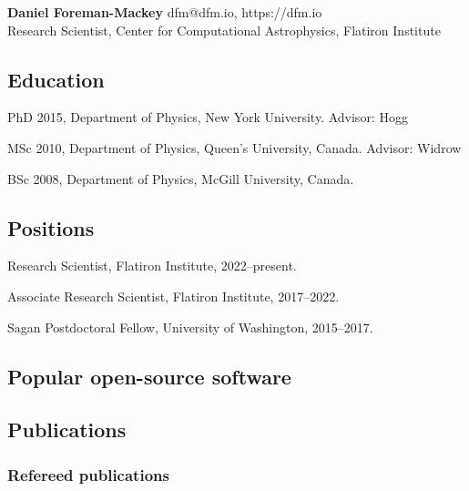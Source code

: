 \documentclass[12pt,letterpaper]{article}
\begin{document}
\thispagestyle{empty}\sloppy\sloppypar\raggedbottom

\textbf{\Large Daniel Foreman-Mackey} \hfill
\textsf{\small dfm@dfm.io, https://dfm.io} \\[0.5ex]
Research Scientist, Center for Computational Astrophysics, Flatiron Institute\\[0.5ex]

\subsection{Education}
\begin{list}{}{\cvlist}
  \item
        PhD 2015, Department of Physics, New York University. Advisor: Hogg
  \item
        MSc 2010, Department of Physics, Queen's University, Canada. Advisor: Widrow
  \item
        BSc 2008, Department of Physics, McGill University, Canada.
\end{list}

\subsection{Positions}
\begin{list}{}{\cvlist}
  \item
        Research Scientist, Flatiron Institute, 2022--present.
  \item
        Associate Research Scientist, Flatiron Institute, 2017--2022.
  \item
        Sagan Postdoctoral Fellow, University of Washington, 2015--2017.
\end{list}

\subsection{Popular open-source software}
\begin{list}{}{\cvlist}
  
\end{list}

\ifdefined\withpubs
  \subsection{Publications}
  

  \subsubsection{Refereed publications}
  \begin{list}{}{\cvlist}
    
  \end{list}
\end{document}

